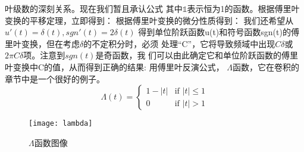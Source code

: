 \documentclass{ctexbook}
\begin{document}
叶级数的深刻关系。现在我们暂且承认公式
其中$\mathds{1}$表示恒为1的函数。根据傅里叶变换的平移定理，立即得到：
根据傅里叶变换的微分性质得到：
我们还希望从$u'(t)=\delta(t),sgn'(t)=2\delta(t)$
得到单位阶跃函数u(t)和符号函数sgn(t)的傅里叶变换，但在考虑$\delta$的不定积分时，必须
处理“C”，它将导致频域中出现$C\delta$或$2\pi C\delta$项。注意到$sgn(t)$是奇函数，我
们可以由此确定它和单位阶跃函数的傅里叶变换中C的值，从而得到正确的结果:
用傅里叶反演公式，
\textbullet $\Lambda$函数，它在卷积的章节中是一个很好的例子。
\[\Lambda(t)=\begin{cases}
        1-|t| & \text{if }|t|\leq 1 \\
        0     & \text{if }|t|>1
    \end{cases}\]
\begin{figure}[htbp]
    \centering
    \texttt{[image: lambda]}
    \caption{$\Lambda$函数图像}
\end{figure}
\end{document}
